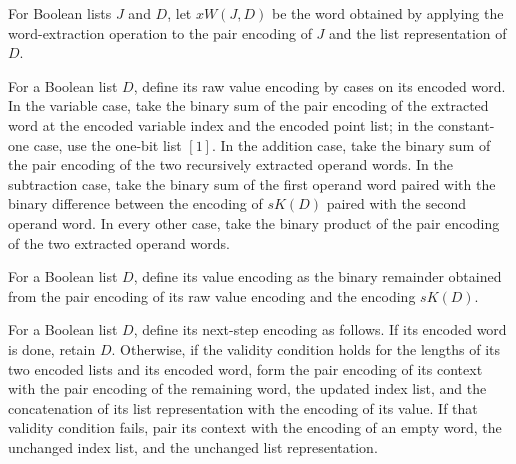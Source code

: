 \begin{definition}
\label{Randomized.PIT.xW}
\leanok
{}
For Boolean lists $J$ and $D$, let $xW(J,D)$ be the word obtained by applying the
word-extraction operation to the pair encoding of $J$ and the list representation of
$D$.
\end{definition}

\begin{definition}
\label{Randomized.PIT.rawValW}
\leanok
{}
For a Boolean list $D$, define its raw value encoding by cases on its encoded word. In
the variable case, take the binary sum of the pair encoding of the extracted word at the
encoded variable index and the encoded point list; in the constant-one case, use the
one-bit list $[1]$. In the addition case, take the binary sum of the pair encoding of
the two recursively extracted operand words. In the subtraction case, take the binary
sum of the first operand word paired with the binary difference between the encoding of
$sK(D)$ paired with the second operand word. In every other case, take the binary
product of the pair encoding of the two extracted operand words.
\end{definition}

\begin{definition}
\label{Randomized.PIT.valW}
\leanok
{}
For a Boolean list $D$, define its value encoding as the binary remainder obtained from
the pair encoding of its raw value encoding and the encoding $sK(D)$.
\end{definition}

\begin{definition}
\label{Randomized.PIT.gStep}
\leanok
{}
For a Boolean list $D$, define its next-step encoding as follows. If its encoded word is
done, retain $D$. Otherwise, if the validity condition holds for the lengths of its two
encoded lists and its encoded word, form the pair encoding of its context with the pair
encoding of the remaining word, the updated index list, and the concatenation of its
list representation with the encoding of its value. If that validity condition fails,
pair its context with the encoding of an empty word, the unchanged index list, and the
unchanged list representation.
\end{definition}

